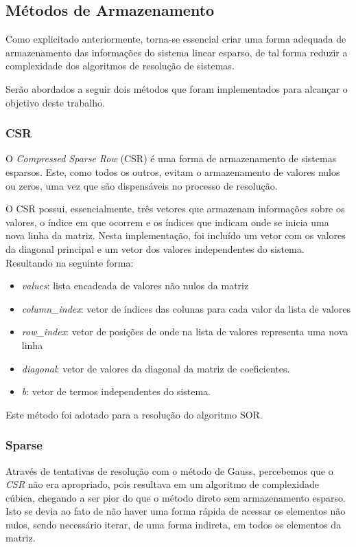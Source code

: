\documentclass[
	article,			%
	11pt,				%
	oneside,			%
	a4paper,			%
	english,			%
	brazil,				%
	sumario=tradicional
	]{abntex2}
\begin{document}
\subsection{Métodos de Armazenamento}
Como explicitado anteriormente, torna-se essencial criar uma forma adequada de armazenamento das informações do sistema linear esparso, de tal forma reduzir a complexidade dos algoritmos de resolução de sistemas.

Serão abordados a seguir dois métodos que foram implementados para alcançar o objetivo deste trabalho.

\subsubsection{CSR}
O \textit{Compressed Sparse Row} (CSR) é uma forma de armazenamento de sistemas esparsos. Este, como todos os outros, evitam o armazenamento de valores nulos ou zeros, uma vez que são dispensáveis no processo de resolução. \cite{crs}

O CSR possui, essencialmente, três vetores que armazenam informações sobre os valores, o índice em que ocorrem e os índices que indicam onde se inicia uma nova linha da matriz. Nesta implementação, foi incluído um vetor com os valores da diagonal principal e um vetor dos valores independentes do sistema. Resultando na seguinte forma:

\begin{itemize}
  \item \textit{values}: lista encadeada de valores não nulos da matriz
  \item \textit{column\_index}: vetor de índices das colunas para cada valor da lista de valores
  \item \textit{row\_index}: vetor de posições de onde na lista de valores representa uma nova linha
  \item \textit{diagonal}: vetor de valores da diagonal da matriz de coeficientes.
  \item \textit{b}: vetor de termos independentes do sistema.
\end{itemize}

Este método foi adotado para a resolução do algoritmo SOR.
    
\subsubsection{Sparse}
Através de tentativas de resolução com o método de Gauss, percebemos que o \textit{CSR} não era apropriado, pois resultava em um algoritmo de complexidade cúbica, chegando a ser pior do que o método direto sem armazenamento esparso. Isto se devia ao fato de não haver uma forma rápida de acessar os elementos não nulos, sendo necessário iterar, de uma forma indireta, em todos os elementos da matriz.
\end{document}
